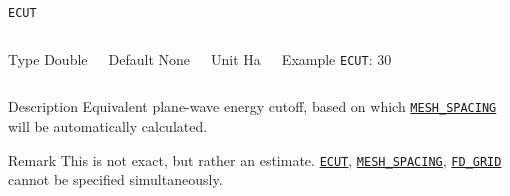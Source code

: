 \documentclass[xcolor=dvipsnames,t]{beamer}
\begin{document}
\begin{frame}[allowframebreaks]{\texttt{ECUT}} \label{ECUT}
\vspace*{-12pt}
\begin{columns}
\begin{block}{Type}
Double
\end{block}

\begin{block}{Default}
None
\end{block}

\begin{block}{Unit}
Ha
\end{block}

\begin{block}{Example}
\texttt{ECUT}: 30
\end{block}
\end{columns}

\begin{block}{Description}
Equivalent plane-wave energy cutoff, based on which \hyperlink{MESH_SPACING}{\texttt{MESH\_SPACING}} will be automatically calculated. 
\end{block}

\begin{block}{Remark}
This is not exact, but rather an estimate. \hyperlink{ECUT}{\texttt{ECUT}}, \hyperlink{MESH_SPACING}{\texttt{MESH\_SPACING}}, \hyperlink{FD_GRID}{\texttt{FD\_GRID}} cannot be specified simultaneously.
\end{block}

\end{frame}
\end{document}
